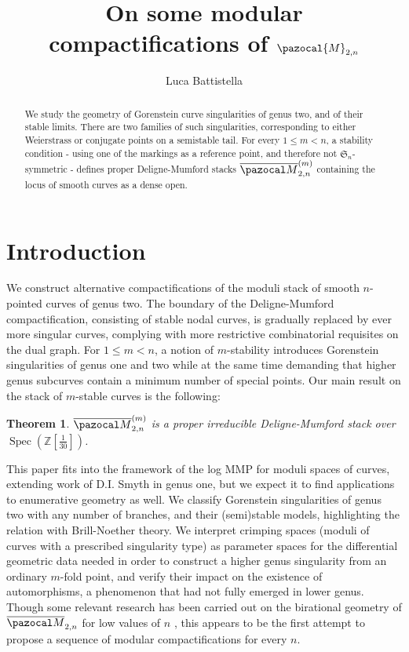 \documentclass[11pt]{amsart}
\title{On some modular compactifications of $\pazocal{M}_{2,n}$}
\author{Luca Battistella}
\newcommand{\oM}{\overline{\pazocal M}}
\theoremstyle{plain}
\newtheorem*{teo*}{Theorem}
\theoremstyle{definition}
\begin{document}
\begin{abstract}
We study the geometry of Gorenstein curve singularities of genus two, and of their stable limits. There are two families of such singularities, corresponding to either Weierstrass or conjugate points on a semistable tail. For every $1\leq m <n$, a stability condition - using one of the markings as a reference point, and therefore not $\mathfrak S_n$-symmetric - defines proper Deligne-Mumford stacks $\oM_{2,n}^{(m)}$ containing the locus of smooth curves as a dense open.
\end{abstract}

\maketitle
\tableofcontents

\section{Introduction}
We construct alternative compactifications of the moduli stack of smooth $n$-pointed curves of genus two. The boundary of the Deligne-Mumford compactification, consisting of stable nodal curves, is gradually replaced by ever more singular curves, complying with more restrictive combinatorial requisites on the dual graph. For $1\leq m <n$, a notion of $m$-stability introduces Gorenstein singularities of genus one and two while at the same time demanding that higher genus subcurves contain a minimum number of special points. Our main result on the stack of $m$-stable curves is the following:
\begin{teo*}
 $\oM^{(m)}_{2,n}$ is a \emph{proper} irreducible Deligne-Mumford stack over $\operatorname{Spec}(\mathbb Z[\frac{1}{30}])$.
\end{teo*}
This paper fits into the framework of the log MMP for moduli spaces of curves, extending work of D.I. Smyth in genus one, but we expect it to find applications to enumerative geometry as well. We classify Gorenstein singularities of genus two with any number of branches, and their (semi)stable models, highlighting the relation with Brill-Noether theory. We interpret crimping spaces (moduli of curves with a prescribed singularity type) as parameter spaces for the differential geometric data needed in order to construct a higher genus singularity from an ordinary $m$-fold point, and verify their impact on the existence of automorphisms, a phenomenon that had not fully emerged in lower genus. Though some relevant research has been carried out on the birational geometry of $\oM_{2,n}$ for low values of $n$ \cite{Hassettg2,HL-tricanonical,Rulla,HL-birational_contraction, FedorchukGrimes,PolishchukJohnson}, this appears to be the first attempt to propose a sequence of modular compactifications for every $n$.
\end{document}
